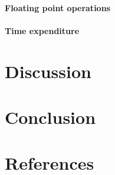 \documentclass[10pt,a4paper]{article}
\begin{document}
\paragraph{Floating point operations}

\paragraph{Time expenditure}



\section{Discussion}

\section{Conclusion}

\section{References}
 
\begin{thebibliography}{9}

\end{thebibliography}













\begin{comment}

$$
\begin{bmatrix}
0 & 0 & 0 & 0 \\
0 & 0 & 0 & 0 \\
0 & 0 & 0 & 0 \\
0 & 0 & 0 & 0 \\
\end{bmatrix}
$$

\begin{lstlisting}[caption=insert caption]
for (unsigned int i = 0; i<100;i++{
}
\end{lstlisting}

\begin{figure}[h]
\texttt{[image: ]}
\caption{include caption}
\end{figure}


HOW TO CITE SOURCES:
use
\cite{reference name}
in the text, and
\bibitem{reference name} 



\end{comment}
\end{document}
